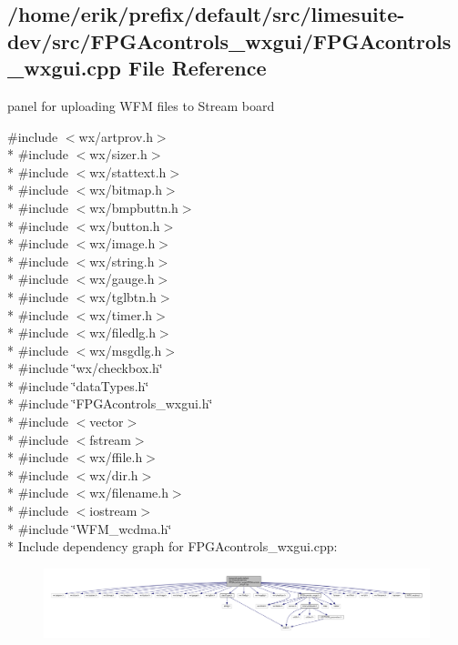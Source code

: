 \subsection{/home/erik/prefix/default/src/limesuite-\/dev/src/\+F\+P\+G\+Acontrols\+\_\+wxgui/\+F\+P\+G\+Acontrols\+\_\+wxgui.cpp File Reference}
\label{FPGAcontrols__wxgui_8cpp}


panel for uploading W\+FM files to Stream board  


{\ttfamily \#include $<$wx/artprov.\+h$>$}\\*
{\ttfamily \#include $<$wx/sizer.\+h$>$}\\*
{\ttfamily \#include $<$wx/stattext.\+h$>$}\\*
{\ttfamily \#include $<$wx/bitmap.\+h$>$}\\*
{\ttfamily \#include $<$wx/bmpbuttn.\+h$>$}\\*
{\ttfamily \#include $<$wx/button.\+h$>$}\\*
{\ttfamily \#include $<$wx/image.\+h$>$}\\*
{\ttfamily \#include $<$wx/string.\+h$>$}\\*
{\ttfamily \#include $<$wx/gauge.\+h$>$}\\*
{\ttfamily \#include $<$wx/tglbtn.\+h$>$}\\*
{\ttfamily \#include $<$wx/timer.\+h$>$}\\*
{\ttfamily \#include $<$wx/filedlg.\+h$>$}\\*
{\ttfamily \#include $<$wx/msgdlg.\+h$>$}\\*
{\ttfamily \#include \char`\"{}wx/checkbox.\+h\char`\"{}}\\*
{\ttfamily \#include \char`\"{}data\+Types.\+h\char`\"{}}\\*
{\ttfamily \#include \char`\"{}F\+P\+G\+Acontrols\+\_\+wxgui.\+h\char`\"{}}\\*
{\ttfamily \#include $<$vector$>$}\\*
{\ttfamily \#include $<$fstream$>$}\\*
{\ttfamily \#include $<$wx/ffile.\+h$>$}\\*
{\ttfamily \#include $<$wx/dir.\+h$>$}\\*
{\ttfamily \#include $<$wx/filename.\+h$>$}\\*
{\ttfamily \#include $<$iostream$>$}\\*
{\ttfamily \#include \char`\"{}W\+F\+M\+\_\+wcdma.\+h\char`\"{}}\\*
Include dependency graph for F\+P\+G\+Acontrols\+\_\+wxgui.\+cpp\+:
\nopagebreak
\begin{figure}[H]
\begin{center}
\leavevmode
\includegraphics[width=350pt]{d3/d2d/FPGAcontrols__wxgui_8cpp__incl}
\end{center}
\end{figure}
